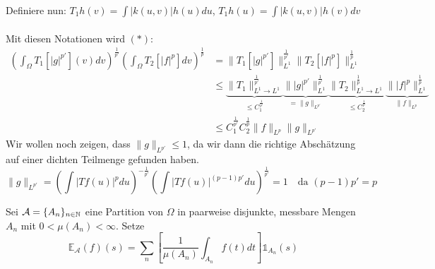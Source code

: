 \begin{beweis}
\begin{itemize}
			Definiere nun: $T_{1} h(v) = \int |k(u, v)| h(u) du$, $T_{1} h(u) = \int |k(u, v)| h(v) dv $ \\ \\
			Mit diesen Notationen wird $(*)$:
			\begin{align*}
				\left( \int_{\Omega} T_{1}[|g|^{p'}](v) dv \right)^{\frac{1}{p'}} \left( \int_{\Omega} T_{2} [|f|^{p}] dv \right)^{\frac{1}{p}} & = \| T_{1}[|g|^{p'}] \|_{L^{1}}^{\frac{1}{p'}} \| T_{2}[|f|^{p}] \|_{L^{1}}^{\frac{1}{p}} \\
				& \leq \underbrace{\| T_{1} \|_{L^{1} \rightarrow L^{1}}^{\frac{1}{p'}}}_{\leq C_{1}^{\frac{1}{p'}}} \underbrace{\||g|^{p'}\|_{L^{1}}^{\frac{1}{p'}}}_{= \|g\|_{L^{p'}}} \underbrace{\| T_{2} \|_{L^{1} \rightarrow L^{1}}^{\frac{1}{p}}}_{\leq C_{2}^{\frac{1}{p}}} \underbrace{\||f|^{p}\|_{L^{1}}^{\frac{1}{p}}}_{\| f \|_{L^{p}}} \\
				& \leq C_{1}^{\frac{1}{p'}} C_{2}^{\frac{1}{p}} \| f \|_{L^{p}} \| g \|_{L^{p'}}
			\end{align*}
			Wir wollen noch zeigen, dass $\| g \|_{L^{p'}} \leq 1$, da wir dann die richtige Abschätzung auf einer dichten Teilmenge gefunden haben.
			\[ \| g \|_{L^{p'}} = \left( \int | T f(u) |^{p} du \right)^{- \frac{1}{p'}} \left( \int |T f(u)|^{(p-1)p'} du \right)^{\frac{1}{p'}} = 1 \quad \text{da } (p - 1) p' = p \]
	\end{itemize}	
\end{beweis}

\begin{definition} 
	Sei $\mathcal{A} = \{ A_{n} \}_{n \in \mathbb{N}}$ eine Partition von $\Omega$ in paarweise disjunkte, messbare Mengen $A_{n}$ mit $0 < \mu(A_{n}) < \infty$. Setze
	\[ \mathds{E}_{\mathcal{A}}(f)(s) = \sum_{n} \left[ \frac{1}{\mu(A_{n})} \int_{A_{n}} f(t) dt \right] \mathds{1}_{A_{n}}(s) \] 
\end{definition}

